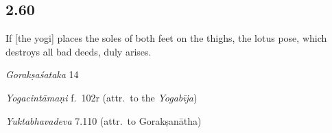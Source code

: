 \begin{ekdosis}

\subsection*{2.60}
\begin{translation}[hp02_060]
If [the yogi] places the soles of both feet on the thighs, the lotus pose, which destroys all bad deeds, duly arises.
\end{translation}

\begin{sources}[hp02_060]
\emph{Gorakṣaśataka} 14

\begin{versinnote}
\end{versinnote}
\end{sources}

\begin{testimonia}[hp02_060]

\emph{Yogacintāmaṇi} f.~102r (attr.~to the \emph{Yogabīja})

\begin{versinnote}
\end{versinnote}

\emph{Yuktabhavadeva} 7.110 (attr.~to Gorakṣanātha)

\begin{versinnote}
\end{versinnote}
\end{testimonia}


\end{ekdosis}
